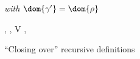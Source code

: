 \begin{figure}
  {\small \flushleft {}
   \hfill\textit{ with }$\dom{\gamma'} = \dom{\rho}$%
  \begin{smathpar}
     {
        \gamma, \rho, V
        \closeDefs
        ,
        \textstyle{\bigdisjunion}
     }
  \end{smathpar}
  }
  \vspace{-0.5cm}
  \caption{``Closing over'' recursive definitions}
  \label{fig:core:close-defs}
\end{figure}
